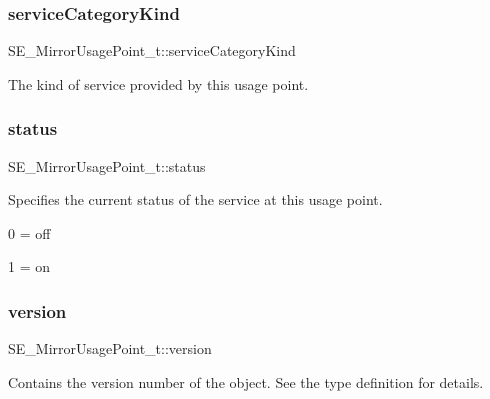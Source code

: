 \subsubsection{\texorpdfstring{service\+Category\+Kind}{serviceCategoryKind}}
{\footnotesize\ttfamily S\+E\+\_\+\+Mirror\+Usage\+Point\+\_\+t\+::service\+Category\+Kind}

The kind of service provided by this usage point. \mbox{\label{group__MirrorUsagePoint_ga4c5a5200060df3be9b92c9d496b0b526}} 
\subsubsection{\texorpdfstring{status}{status}}
{\footnotesize\ttfamily S\+E\+\_\+\+Mirror\+Usage\+Point\+\_\+t\+::status}

Specifies the current status of the service at this usage point.

0 = off

1 = on \mbox{\label{group__MirrorUsagePoint_ga5b263a4254e4f7b510a2dd5fe22e598c}} 
\subsubsection{\texorpdfstring{version}{version}}
{\footnotesize\ttfamily S\+E\+\_\+\+Mirror\+Usage\+Point\+\_\+t\+::version}

Contains the version number of the object. See the type definition for details. 
